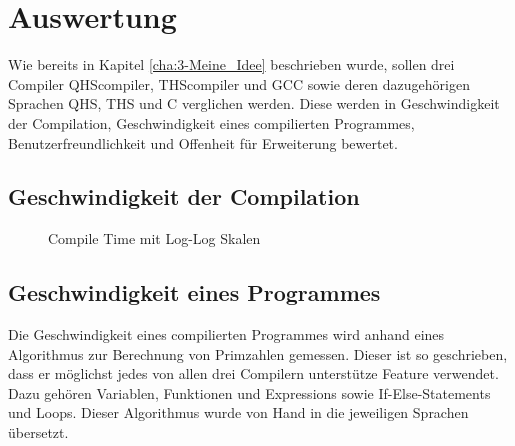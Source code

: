 \chapter{Auswertung}

Wie bereits in Kapitel \ref{cha:3-Meine_Idee} beschrieben wurde, sollen drei Compiler QHScompiler, THScompiler und GCC sowie deren dazugehörigen Sprachen QHS, THS und C verglichen werden.
Diese werden in Geschwindigkeit der Compilation, Geschwindigkeit eines compilierten Programmes, Benutzerfreundlichkeit und Offenheit für Erweiterung bewertet. 

\section{Geschwindigkeit der Compilation}

\begin{figure}[h!]
\centering
{}
\caption{Compile Time mit Log-Log Skalen}
\end{figure}

\section{Geschwindigkeit eines Programmes}
Die Geschwindigkeit eines compilierten Programmes wird anhand eines Algorithmus zur Berechnung von Primzahlen gemessen. Dieser ist so geschrieben, dass er möglichst jedes von allen drei Compilern unterstütze Feature verwendet.
Dazu gehören Variablen, Funktionen und Expressions sowie If-Else-Statements und Loops. Dieser Algorithmus wurde von Hand in die jeweiligen Sprachen übersetzt.

